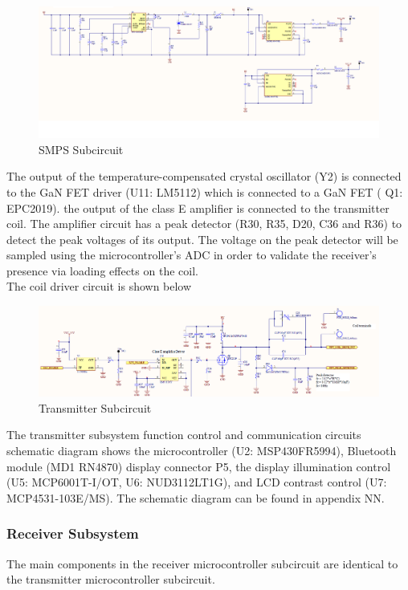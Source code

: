 \documentclass[12pt]{article}
\begin{document}
\begin{figure}[h!]
\centering
\includegraphics[width=0.925\linewidth]{tx_smps}
\caption{SMPS Subcircuit}
\end{figure}

\indent
The output of the temperature-compensated crystal oscillator (Y2) is connected to the GaN FET driver (U11: LM5112) which is connected to a GaN FET ( Q1: EPC2019). the output of the class E amplifier is connected to the transmitter coil. The amplifier circuit has a peak detector (R30, R35, D20, C36 and R36) to detect the peak voltages of its output. The voltage on the peak detector will be sampled using the microcontroller’s ADC in order to validate the receiver’s presence via loading effects on the coil.\\

\indent
The coil driver circuit is shown below 
\hfill

\begin{figure}[h!]
\centering
\includegraphics[width=0.925\linewidth]{tx_dc_rf_driver}
\caption{Transmitter Subcircuit}
\end{figure}

\indent
The transmitter subsystem function control and communication circuits schematic diagram shows the microcontroller (U2: MSP430FR5994), Bluetooth module (MD1 RN4870) display connector P5, the display illumination control (U5: MCP6001T-I/OT, U6: NUD3112LT1G), and LCD contrast control (U7: MCP4531-103E/MS). The schematic diagram can be found in appendix NN.

\pagebreak

\subsubsection{Receiver Subsystem} The main components in the receiver microcontroller subcircuit are identical to the transmitter microcontroller subcircuit.\\
\end{document}
